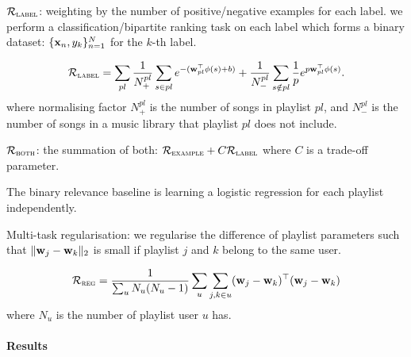 $\mathcal{R}_\textsc{label}$: weighting by the number of positive/negative examples for each label.
\ie we perform a classification/bipartite ranking task on each label which forms a binary dataset:
$\{\mathbf{x}_n, y_k\}_{n=1}^N$ for the $k$-th label.

\begin{equation*}
\mathcal{R}_\textsc{label} 
= \displaystyle \sum_{pl}
  \frac{1}{N_+^{pl}} \sum_{s \in pl} e^{-(\mathbf{w}_{pl}^\top \phi(s) + b)} +
  \frac{1}{N_-^{pl}} \sum_{s \notin pl} \frac{1}{p} e^{p \mathbf{w}_{pl}^\top \phi(s)}.
\end{equation*}
where normalising factor $N_+^{pl}$ is the number of songs in playlist $pl$,
and $N_-^{pl}$ is the number of songs in a music library that playlist $pl$ does not include.

$\mathcal{R}_\textsc{both}$: the summation of both: $\mathcal{R}_\textsc{example} + C \mathcal{R}_\textsc{label}$ 
where $C$ is a trade-off parameter.

The binary relevance baseline is learning a logistic regression for each playlist independently.

Multi-task regularisation: we regularise the difference of playlist parameters 
such that $\|\mathbf{w}_j - \mathbf{w}_k\|_2$ is small if playlist $j$ and $k$ belong to the same user.

\begin{equation*}
\mathcal{R}_\textsc{reg} = \frac{1}{\sum_u N_u (N_u - 1)} \sum_u \sum_{j, k \in u} (\mathbf{w}_j - \mathbf{w}_k)^\top (\mathbf{w}_j - \mathbf{w}_k)
\end{equation*}
where $N_u$ is the number of playlist user $u$ has.

\paragraph{Results}

